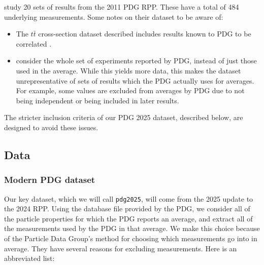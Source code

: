 \documentclass[12pt]{article}
\begin{document}
\citet{baker2013meta} study 20 sets of results from the 2011 PDG RPP. These have a total of 484 underlying measurements. Some notes on their dataset to be aware of:
\begin{itemize}
\item The $t\bar{t}$ cross-section dataset described includes results known to PDG to be correlated \citep{pdg2011topquark}.
\item \citet{baker2013meta} consider the whole set of experiments reported by PDG, instead of just those used in the average. While this yields more data, this makes the dataset unrepresentative of sets of results which the PDG actually uses for averages. For example, some values are excluded from averages by PDG due to not being independent or being included in later results.
\end{itemize}
The stricter inclusion criteria of our PDG 2025 dataset, described below, are designed to avoid these issues.

\subsection{Data}

\subsubsection{Modern PDG dataset}

Our key dataset, which we will call \texttt{pdg2025}, will come from the 2025 update to the 2024 RPP. Using the database file provided by the PDG, we consider all of the particle properties for which the PDG reports an average, and extract all of the measurements used by the PDG in that average. We make this choice because of the Particle Data Group's method for choosing which measurements go into in average. They have several reasons for excluding measurements. Here is an abbreviated list:
\end{document}
